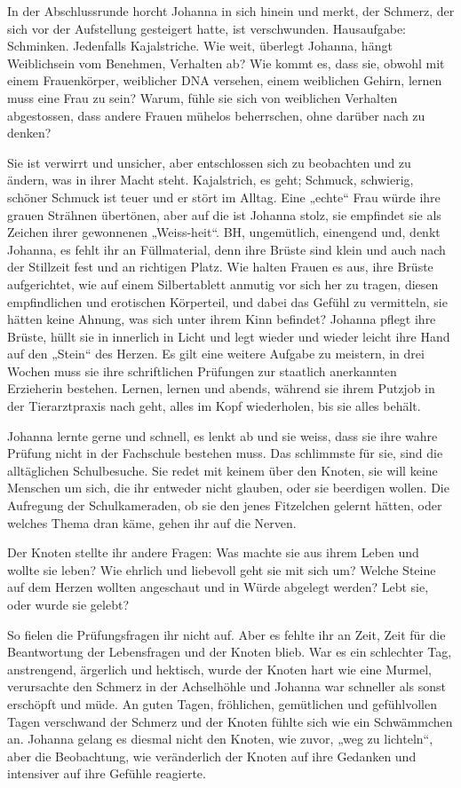 \documentclass[10pt,titlepage,a5paper]{book}
\begin{document}
In der Abschlussrunde horcht Johanna in sich hinein und merkt, der Schmerz, der sich vor der Aufstellung gesteigert hatte, ist verschwunden.
Hausaufgabe: Schminken. Jedenfalls Kajalstriche. Wie weit, überlegt Johanna, hängt Weiblichsein vom Benehmen, Verhalten ab? Wie kommt es, dass sie, obwohl mit einem Frauenkörper, weiblicher DNA versehen, einem weiblichen Gehirn, lernen muss eine Frau zu sein? Warum, fühle sie sich von weiblichen Verhalten abgestossen, dass andere Frauen mühelos beherrschen, ohne darüber nach zu denken?

Sie ist verwirrt und unsicher, aber entschlossen sich zu beobachten und zu ändern, was in ihrer Macht steht. Kajalstrich, es geht; Schmuck, schwierig, schöner Schmuck ist teuer und er stört im Alltag. Eine „echte“ Frau würde ihre grauen Strähnen übertönen, aber auf die ist Johanna stolz, sie empfindet sie als Zeichen ihrer gewonnenen „Weiss-heit“. BH, ungemütlich, einengend und, denkt Johanna, es  fehlt ihr an Füllmaterial, denn ihre Brüste sind klein und auch nach der Stillzeit fest und an richtigen Platz. Wie halten Frauen es aus, ihre Brüste aufgerichtet, wie auf einem Silbertablett anmutig vor sich her zu tragen, diesen empfindlichen und erotischen Körperteil, und dabei das Gefühl zu vermitteln, sie hätten keine Ahnung, was sich unter ihrem Kinn befindet?
Johanna pflegt ihre Brüste, hüllt sie in innerlich in Licht und legt wieder und wieder leicht ihre Hand auf den „Stein“ des Herzen. Es gilt eine weitere Aufgabe zu meistern, in drei Wochen muss sie ihre schriftlichen Prüfungen zur staatlich anerkannten Erzieherin bestehen.  Lernen, lernen und abends, während sie ihrem Putzjob in der Tierarztpraxis nach geht, alles im Kopf wiederholen, bis sie alles behält.

Johanna lernte gerne und schnell, es lenkt ab und sie weiss, dass sie ihre wahre Prüfung nicht in der Fachschule bestehen muss. Das schlimmste für sie, sind die alltäglichen Schulbesuche. Sie redet mit keinem über den Knoten, sie will keine Menschen um sich, die ihr entweder nicht glauben, oder sie beerdigen wollen. Die Aufregung der Schulkameraden, ob sie den jenes Fitzelchen gelernt hätten, oder welches Thema dran käme, gehen ihr auf die Nerven. 

Der Knoten stellte ihr andere Fragen: Was machte sie aus ihrem Leben und wollte sie leben? Wie ehrlich und liebevoll geht sie mit sich um? Welche Steine auf dem Herzen wollten angeschaut und in Würde abgelegt werden? Lebt sie, oder wurde sie gelebt?

So fielen die Prüfungsfragen ihr nicht auf. Aber es fehlte ihr an Zeit, Zeit für die Beantwortung der Lebensfragen und der Knoten blieb. War es ein schlechter Tag, anstrengend, ärgerlich und hektisch, wurde der Knoten hart wie eine Murmel, verursachte den Schmerz in der Achselhöhle und Johanna war schneller als sonst erschöpft und müde. An guten Tagen, fröhlichen, gemütlichen und gefühlvollen Tagen verschwand der Schmerz und der Knoten fühlte sich wie ein Schwämmchen an. Johanna gelang es diesmal nicht den Knoten, wie zuvor, „weg zu lichteln“, aber die Beobachtung, wie veränderlich der Knoten auf ihre Gedanken und intensiver auf ihre Gefühle reagierte.
\end{document}
